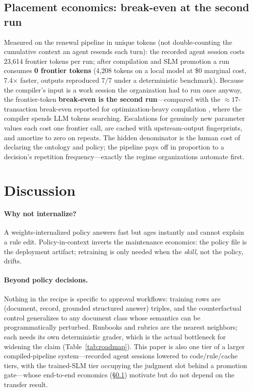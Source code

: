 \documentclass[11pt]{article}
\begin{document}
\subsection{Placement economics: break-even at the second run}\label{sec:economics}
Measured on the renewal pipeline in unique tokens (not double-counting the cumulative context an agent resends each turn): the recorded agent session costs 23{,}614 frontier tokens per run; after compilation and SLM promotion a run consumes \textbf{0 frontier tokens} (4{,}208 tokens on a local model at \$0 marginal cost, 7.4$\times$ faster, outputs reproduced 7/7 under a deterministic benchmark). Because the compiler's input is a work session the organization had to run once anyway, the frontier-token \textbf{break-even is the second run}---compared with the ${\approx}17$-transaction break-even reported for optimization-heavy compilation \citep{compiledai2026}, where the compiler spends LLM tokens searching. Escalations for genuinely new parameter values each cost one frontier call, are cached with upstream-output fingerprints, and amortize to zero on repeats. The hidden denominator is the human cost of declaring the ontology and policy; the pipeline pays off in proportion to a decision's repetition frequency---exactly the regime organizations automate first.

\section{Discussion}\label{sec:discussion}

\paragraph{Why not internalize?} A weights-internalized policy answers fast but ages instantly and cannot explain a rule edit. Policy-in-context inverts the maintenance economics: the policy file is the deployment artifact; retraining is only needed when the \emph{skill}, not the policy, drifts.

\paragraph{Beyond policy decisions.} Nothing in the recipe is specific to approval workflows: training rows are (document, record, grounded structured answer) triples, and the counterfactual control generalizes to any document class whose semantics can be programmatically perturbed. Runbooks and rubrics are the nearest neighbors; each needs its own deterministic grader, which is the actual bottleneck for widening the claim (Table~\ref{tab:roadmap}). This paper is also one tier of a larger compiled-pipeline system---recorded agent sessions lowered to code/rule/cache tiers, with the trained-SLM tier occupying the judgment slot behind a promotion gate---whose end-to-end economics (\S\ref{sec:economics}) motivate but do not depend on the transfer result.
\end{document}
